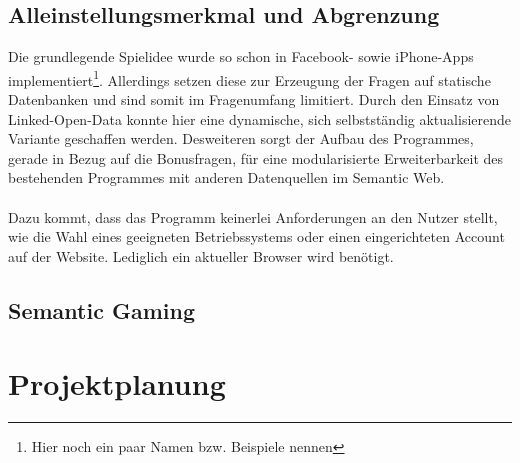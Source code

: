 \documentclass[a4paper, 11pt]{article}
\begin{document}
\subsection{Alleinstellungsmerkmal und Abgrenzung}
Die grundlegende Spielidee wurde so schon in Facebook- sowie iPhone-Apps implementiert\footnote{Hier noch ein paar Namen bzw. Beispiele nennen}. Allerdings setzen diese zur Erzeugung der Fragen auf statische Datenbanken und sind somit im Fragenumfang limitiert. Durch den Einsatz von Linked-Open-Data konnte hier eine dynamische, sich selbstständig aktualisierende Variante geschaffen werden. Desweiteren sorgt der Aufbau des Programmes, gerade in Bezug auf die Bonusfragen, für eine modularisierte Erweiterbarkeit des bestehenden Programmes mit anderen Datenquellen im Semantic Web.\\\\
Dazu kommt, dass das Programm keinerlei Anforderungen an den Nutzer stellt, wie die Wahl eines geeigneten Betriebssystems oder einen eingerichteten Account auf der Website. Lediglich ein aktueller Browser wird benötigt.
\subsection{Semantic Gaming}
\newpage
\section{Projektplanung}
\end{document}
